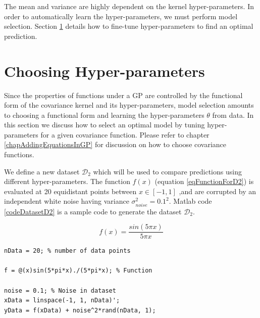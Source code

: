 The mean and variance are highly dependent on the kernel hyper-parameters. In order to automatically learn the hyper-parameters, we must perform model selection. Section \ref{secHyperParameter} details how to fine-tune hyper-parameters to find an optimal prediction.

\section{Choosing Hyper-parameters}\label{secHyperParameter}
Since the properties of functions under a GP are controlled by the functional form of the covariance kernel and its hyper-parameters, model selection amounts to choosing a functional form and learning the hyper-parameters $\theta$ from data. In this section we discuss how to select an optimal model by tuning hyper-parameters for a given covariance function. Please refer to chapter \ref{chapAddingEquationsInGP} for discussion on how to choose covariance functions. 

We define a new dataset $\mathcal{D}_{2}$ which will be used to compare predictions using different hyper-parameters. The function $f(x)$ (equation \ref{eqFunctionForD2}) is evaluated at 20 equidistant points between $x \in [-1, 1]$ ,and are corrupted by an independent white noise having variance $\sigma_{noise}^2 = 0.1^2$. Matlab code \ref{codeDatasetD2} is a sample code to generate the dataset  $\mathcal{D}_{2}$. 

\begin{equation}\label{eqFunctionForD2}
f(x) = \frac{sin(5 \pi x)}{5 \pi x}
\end{equation}

\begin{mdframed}[hidealllines=true,backgroundcolor=lightgray!20]
\begin{lstlisting}[caption={Code for dataset D2}, 
                    captionpos=b, 
                    label={codeDatasetD2},
                    style=Matlab-editor,
                    basicstyle=\color{black}\ttfamily\small,
                    backgroundcolor = \color{MatlabCellColour}]
nData = 20; % number of data points

f = @(x)sin(5*pi*x)./(5*pi*x); % Function

noise = 0.1; % Noise in dataset
xData = linspace(-1, 1, nData)';
yData = f(xData) + noise^2*rand(nData, 1);

\end{lstlisting}
\end{mdframed}

